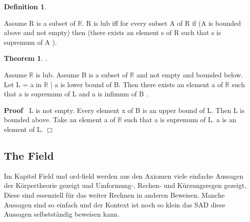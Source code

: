 \documentclass{article}
\newenvironment{forthel}{\begin{leftbar}}{\end{leftbar}}
\newenvironment{proof}{\noindent\textbf{Proof\ }}{\hspace*{\fill}$\Box$\medskip}
\newtheorem{theorem}{Theorem}
\newtheorem{definition}{Definition}
\begin{document}
\begin{forthel}
\begin{definition}
\end{definition}
Assume R is a subset of $\mathbb{R}$.
R is lub iff for every subset A of R
if (A is bounded above and not empty) then (there exists an element s of R such that s is supremum of A ).

\begin{theorem}
.
\end{theorem}
Assume $\mathbb{R}$ is lub.
Assume B is a subset of $\mathbb{R}$ and not empty and bounded below.
Let L = {a in $\mathbb{R}$ | a is lower bound of B}.
Then there exists an element a of $\mathbb{R}$ such that a is supremum of L and a is infimum of B .

\begin{proof}
L is not empty.
Every element x of B is an upper bound of L.
Then L is bounded above.
Take an element a of $\mathbb{R}$ such that a is supremum of L.
a is an element of L.
\end{proof}





\end{forthel}

\subsection{The Field}

Im Kapitel Field und ord-field werden aus den Axiomen viele einfache Aussagen der Körpertheorie gezeigt und Umformung-, Rechen- und Kürzungsregen gezeigt, Diese sind essenziell für das weiter Rechnen in anderen Beweisen.
Manche Aussagen sind so einfach und der Kontext ist noch so klein das SAD diese Aussagen selbstst\"andig beweisen kann.
\end{document}
